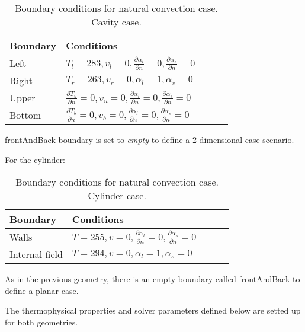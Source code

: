 \begin{table}[h!]
	\begin{tabular}{@{}lllll@{}}
		\toprule[1pt]
		\textbf{Boundary} & \textbf{Conditions}  \\ \midrule[2pt]
		Left & $T_{l}=283, v_{l} = 0, \frac{\partial \alpha_{l}}{\partial n} = 0, \frac{\partial \alpha_{s}}{\partial n} = 0    $  \\
		Right & $T_{r}=263, v_{r} = 0, \alpha_{l} = 1, \alpha_{s} = 0 $ \\
		Upper & $\frac{\partial T_{u}}{\partial n} = 0, v_{u} = 0, \frac{\partial \alpha_{l}}{\partial n} = 0, \frac{\partial \alpha_{s}}{\partial n} = 0$  \\
		Bottom & $\frac{\partial T_{b}}{\partial n} = 0, v_{b} = 0, \frac{\partial \alpha_{l}}{\partial n} = 0, \frac{\partial \alpha_{s}}{\partial n} = 0 $  \\ \bottomrule[1pt]		
	\end{tabular}
	\centering
	\caption{Boundary conditions for natural convection case. Cavity case.}	
	\label{3.8tab}
\end{table}

\noindent frontAndBack boundary is set to \textit{empty} to define a 2-dimensional case-scenario. 

For the cylinder:
\begin{table}[h!]
	\begin{tabular}{@{}lllll@{}}
		\toprule[1pt]
		\textbf{Boundary} & \textbf{Conditions}  \\ \midrule[2pt]
		Walls & $T=255, v = 0,\frac{\partial \alpha_{l}}{\partial n} = 0, \frac{\partial \alpha_{s}}{\partial n} = 0    $  \\
		Internal field & $T=294, v = 0, \alpha_{l} = 1, \alpha_{s} = 0 $ \\
		\bottomrule[1pt]		
	\end{tabular}
	\centering
	\caption{Boundary conditions for natural convection case. Cylinder case.}	
	\label{3.9tab}
\end{table}

\noindent As in the previous geometry, there is an empty boundary called frontAndBack to define a planar case.

\noindent The thermophysical properties and solver parameters defined below are setted up for both geometries.
\clearpage
